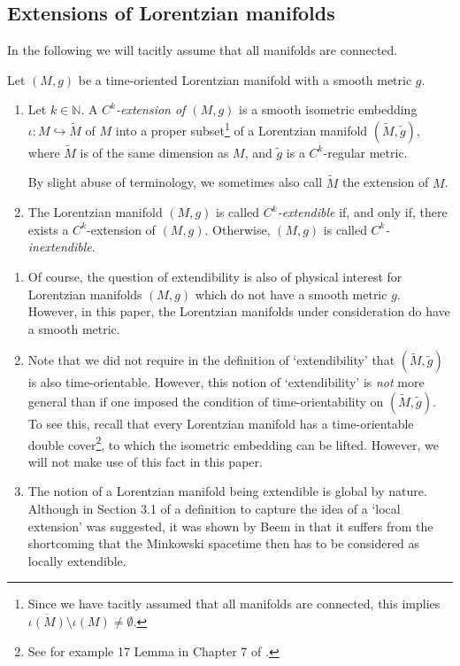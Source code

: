 \documentclass[reqno]{article}
\newcommand{\N}{\mathbb{N}}
\begin{document}
\subsection{Extensions of Lorentzian manifolds}

In the following we will tacitly assume that all manifolds are connected.

\begin{definition}\label{schwdef:extension}
Let $(M,g)$ be a time-oriented Lorentzian manifold with a smooth metric $g$.
\begin{enumerate}
\item Let $k \in \N$. A \emph{$C^k$-extension of $(M,g)$} is a smooth isometric embedding $\iota : M \hookrightarrow \tilde{M}$ of $M$ into a proper subset\footnote{Since we have tacitly assumed that all manifolds are connected, this implies $\overline{\iota(M)} \setminus \iota(M) \neq \emptyset$.} of a Lorentzian manifold $(\tilde{M}, \tilde{g})$, where $\tilde{M}$ is of the same dimension as $M$, and $\tilde{g}$ is a $C^k$-regular metric. 

By slight abuse of terminology, we sometimes also call $\tilde{M}$ the extension of $M$.
\item The Lorentzian manifold $(M,g)$ is called \emph{$C^k$-extendible} if, and only if, there exists a $C^k$-extension of $(M,g)$. Otherwise, $(M,g)$ is called \emph{$C^k$-inextendible}.
\end{enumerate}
\end{definition}

\begin{remark}\label{schwrem:course_question_extendibility_also}
\begin{enumerate}
\item Of course, the question of extendibility is also of physical interest for Lorentzian manifolds $(M,g)$ which do not have a smooth metric $g$. However, in this paper, the Lorentzian manifolds under consideration do have a smooth metric.

\item Note that we did not require in the definition of `extendibility' that $(\tilde{M},\tilde{g})$ is also time-orientable. However, this notion of `extendibility' is \emph{not} more general than if one imposed the condition of time-orientability on $(\tilde{M},\tilde{g})$. To see this, recall that every Lorentzian manifold has a time-orientable double cover\footnote{See for example 17 Lemma in Chapter 7 of \cite{ONeill}.}, to which the isometric embedding can be lifted. However, we will not make use of this fact in this paper.

\item The notion of a Lorentzian manifold being extendible is global by nature. Although in Section 3.1 of \cite{HawkEllis} a definition to capture the idea of a `local extension' was suggested, it was shown by Beem in \cite{Beem80} that it suffers from the shortcoming that the Minkowski spacetime then has to be considered as locally extendible. 
\end{enumerate}
\end{remark}
\end{document}
